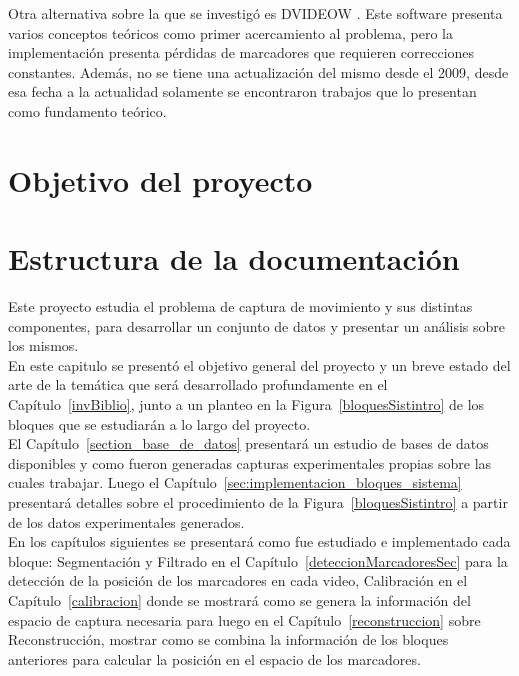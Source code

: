 Otra alternativa sobre la que se investigó es DVIDEOW \cite{figueroa2003flexible}. Este software presenta varios conceptos teóricos como primer acercamiento al problema, pero la implementación presenta pérdidas de marcadores que requieren correcciones constantes. Además, no se tiene una actualización del mismo desde el 2009, desde esa fecha a la actualidad solamente se encontraron trabajos que lo presentan como fundamento teórico.

\section{Objetivo del proyecto}

 

\section{Estructura de la documentación}

Este proyecto estudia el problema de captura de movimiento y sus distintas componentes, para desarrollar un conjunto de datos y presentar un análisis sobre los mismos. 
\\

En este capitulo se presentó el objetivo general del proyecto y un breve estado del arte de la temática que será desarrollado profundamente en el Capítulo~\ref{invBiblio}, junto a un planteo en la Figura~\ref{bloquesSistintro} de los bloques que se estudiarán a lo largo del proyecto. 
\\

El Capítulo~\ref{section_base_de_datos} presentará un estudio de bases de datos disponibles y como fueron generadas capturas experimentales propias sobre las cuales trabajar. Luego el Capítulo~\ref{sec:implementacion_bloques_sistema} presentará detalles sobre el procedimiento de la Figura~\ref{bloquesSistintro} a partir de los datos experimentales generados. 
\\

En los capítulos siguientes se presentará como fue estudiado e implementado cada bloque: Segmentación y Filtrado en el Capítulo~\ref{deteccionMarcadoresSec} para la detección de la posición de los marcadores en cada video, Calibración en el Capítulo~\ref{calibracion} donde se mostrará como se genera la información del espacio de captura necesaria para luego en el Capítulo~\ref{reconstruccion} sobre Reconstrucción, mostrar como se combina la información de los bloques anteriores para calcular la posición en el espacio de los marcadores. 
\\

